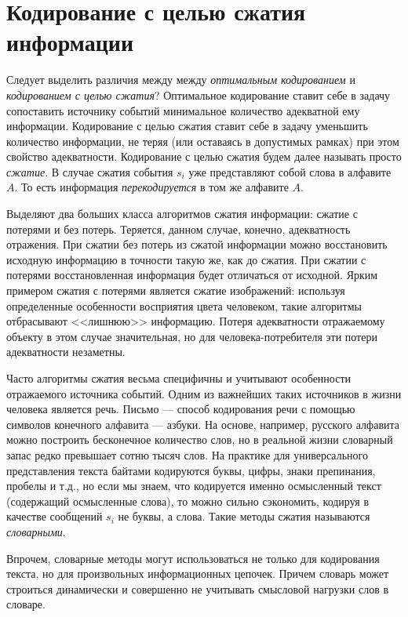 \section{Кодирование с целью сжатия информации}

Следует выделить различия между между \emph{оптимальным кодированием} и \emph{кодированием с целью сжатия}? Оптимальное кодирование ставит себе в задачу сопоставить источнику событий минимальное количество адекватной ему информации. Кодирование с целью сжатия ставит себе в задачу уменьшить количество информации, не теряя (или оставаясь в допустимых рамках) при этом свойство адекватности. Кодирование с целью сжатия будем далее называть просто \emph{сжатие}. В случае сжатия события $s_i$ уже представляют собой слова в алфавите $A$. То есть информация \emph{перекодируется} в том же алфавите $A$.

Выделяют два больших класса алгоритмов сжатия информации: сжатие с потерями и без потерь. Теряется, данном случае, конечно, адекватность отражения. При сжатии без потерь из сжатой информации можно восстановить исходную информацию в точности такую же, как до сжатия. При сжатии с потерями восстановленная информация будет отличаться от исходной. Ярким примером сжатия с потерями является сжатие изображений: используя определенные особенности восприятия цвета человеком, такие алгоритмы отбрасывают <<лишнюю>> информацию. Потеря адекватности отражаемому объекту в этом случае значительная, но для человека-потребителя эти потери адекватности незаметны.

Часто алгоритмы сжатия весьма специфичны и учитывают особенности отражаемого источника событий. Одним из важнейших таких источников в жизни человека является речь. Письмо --- способ кодирования речи с помощью символов конечного алфавита --- азбуки. На основе, например, русского алфавита можно построить бесконечное количество слов, но в реальной жизни словарный запас редко превышает сотню тысяч слов. На практике для универсального представления текста байтами кодируются буквы, цифры, знаки препинания, пробелы и т.д., но если мы знаем, что кодируется именно осмысленный текст (содержащий осмысленные слова), то можно сильно сэкономить, кодируя в качестве сообщений $s_i$ не буквы, а слова. Такие методы сжатия называются \emph{словарными}. 

Впрочем, словарные методы могут использоваться не только для кодирования текста, но для произвольных информационных цепочек. Причем словарь может строиться динамически и совершенно не учитывать смысловой нагрузки слов в словаре.

